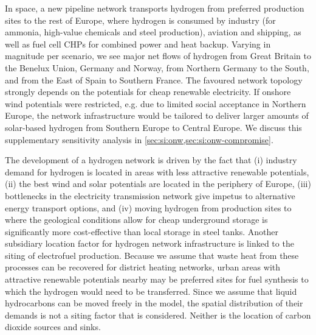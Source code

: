 In space, a new pipeline network transports hydrogen from preferred production
sites to the rest of Europe, where hydrogen is consumed by industry (for
ammonia, high-value chemicals and steel production), aviation and shipping, as
well as fuel cell CHPs for combined power and heat backup. Varying in magnitude
per scenario, we see major net flows of hydrogen from Great Britain to the
Benelux Union, Germany and Norway, from Northern Germany to the South, and from
the East of Spain to Southern France. The favoured network topology strongly
depends on the potentials for cheap renewable electricity. If onshore wind
potentials were restricted, e.g. due to limited social acceptance in Northern
Europe, the network infrastructure would be tailored to deliver larger amounts
of solar-based hydrogen from Southern Europe to Central Europe. We discuss this
supplementary sensitivity analysis in \cref{sec:si:onw,sec:si:onw-compromise}.


The development of a hydrogen network is driven by the fact that (i) industry
demand for hydrogen is located in areas with less attractive renewable
potentials, (ii) the best wind and solar potentials are located in the periphery
of Europe, (iii) bottlenecks in the electricity transmission network give
impetus to alternative energy transport options, and (iv) moving hydrogen from
production sites to where the geological conditions allow for cheap underground
storage is significantly more cost-effective than local storage in steel tanks.
Another subsidiary location factor for hydrogen network infrastructure is linked
to the siting of electrofuel production. Because we assume that waste heat from
these processes can be recovered for district heating networks, urban areas with
attractive renewable potentials nearby may be preferred sites for fuel synthesis
to which the hydrogen would need to be transferred. Since we assume that liquid
hydrocarbons can be moved freely in the model, the spatial distribution of their
demands is not a siting factor that is considered. Neither is the location of
carbon dioxide sources and sinks.

